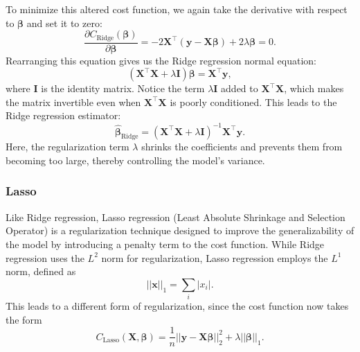 \documentclass[aps,pra,english,notitlepage,reprint,nofootinbib]{revtex4-1}  %
\begin{document}
To minimize this altered cost function, we again take the derivative with respect to $\boldsymbol{\beta}$ and set it to zero:
\begin{equation}
  \frac{\partial C_{\text{Ridge}}(\boldsymbol{\beta})}{\partial \boldsymbol{\beta}} = -2 \mathbf{X}^\top (\mathbf{y} - \mathbf{X} \boldsymbol{\beta}) + 2 \lambda \boldsymbol{\beta} = 0.
\end{equation}
Rearranging this equation gives us the Ridge regression normal equation:
\begin{equation}
  (\mathbf{X}^\top \mathbf{X} + \lambda \mathbf{I}) \boldsymbol{\beta} = \mathbf{X}^\top \mathbf{y},
\end{equation}
where $\mathbf{I}$ is the identity matrix. Notice the term $\lambda \mathbf{I}$ added to $\mathbf{X}^\top \mathbf{X}$, which makes the matrix invertible even when $\mathbf{X}^\top \mathbf{X}$ is poorly conditioned. This leads to the Ridge regression estimator:
\begin{equation}
  \boldsymbol{\hat{\beta}}_{\text{Ridge}} = (\mathbf{X}^\top \mathbf{X} + \lambda \mathbf{I})^{-1} \mathbf{X}^\top \mathbf{y}.
\end{equation}
Here, the regularization term $\lambda$ shrinks the coefficients and prevents them from becoming too large, thereby controlling the model's variance. 



\subsubsection{Lasso}\label{subsubsec:lasso} 
Like Ridge regression, Lasso regression (Least Absolute Shrinkage and Selection Operator) is a regularization technique designed to improve the generalizability of the model by introducing a penalty term to the cost function. While Ridge regression uses the $L^2$ norm for regularization, Lasso regression employs the $L^1$ norm, defined as 
\begin{equation*}
  \left|\left|\mathbf{x}\right|\right|_1 = \sum_i|x_i|.
\end{equation*}
This leads to a different form of regularization, since the cost function now takes the form
\begin{equation}
  C_{\text{Lasso}}(\mathbf{X},\boldsymbol{\beta}) = \frac{1}{n}\left|\left|\mathbf{y}-\mathbf{X}\boldsymbol{\beta} \right|\right|_2^2 + \lambda \left|\left|\boldsymbol{\beta}\right|\right|_1.
\end{equation}
\end{document}
